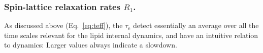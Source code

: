 \documentclass[journal=jcisd8,manuscript=article,layout=twocolumn]{achemso}
\begin{document}
\subsubsection*{Spin-lattice relaxation rates $R_1$.}
As discussed above (Eq.~\eqref{eq:teff}), the $\tau_\mathrm{e}$ detect essentially an average over all the time scales relevant for the lipid internal dynamics, and
have an intuitive relation to dynamics: Larger values always indicate a slowdown.  
%
%
\end{document}
